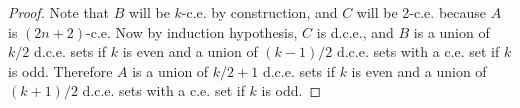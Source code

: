 \documentclass{article}
\begin{document}
\begin{enumerate}[label={\bf Q\arabic*:}]
\begin{proof}
      Note that $B$ will be $k$-c.e. by construction, and $C$ will be
      2-c.e. because $A$ is $(2n+2)$-c.e. Now by induction hypothesis, $C$
      is d.c.e., and $B$ is a union of $k/2$ d.c.e. sets if $k$ is even and
      a union of $(k-1)/2$ d.c.e. sets with a c.e. set if $k$ is odd.
      Therefore $A$ is a union of $k/2+1$ d.c.e. sets if $k$ is even and
      a union of $(k+1)/2$ d.c.e. sets with a c.e. set if $k$ is odd.
    \end{proof}
\end{enumerate}
\end{document}
